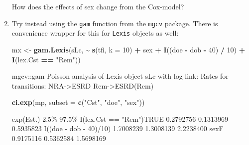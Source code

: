 \documentclass[
]{book}
\newenvironment{Shaded}{\begin{snugshade}}{\end{snugshade}}
\newcommand{\AttributeTok}[1]{\textcolor[rgb]{0.13,0.29,0.53}{#1}}
\newcommand{\DecValTok}[1]{\textcolor[rgb]{0.00,0.00,0.81}{#1}}
\newcommand{\FunctionTok}[1]{\textcolor[rgb]{0.13,0.29,0.53}{\textbf{#1}}}
\newcommand{\NormalTok}[1]{#1}
\newcommand{\OtherTok}[1]{\textcolor[rgb]{0.56,0.35,0.01}{#1}}
\newcommand{\SpecialCharTok}[1]{\textcolor[rgb]{0.81,0.36,0.00}{\textbf{#1}}}
\newcommand{\StringTok}[1]{\textcolor[rgb]{0.31,0.60,0.02}{#1}}
\begin{document}
\begin{enumerate}
  How does the effects of sex change from the Cox-model?
\item
  Try instead using the \texttt{gam} function from the
  \texttt{mgcv} package. There is convenience wrapper for this for
  \texttt{Lexis} objects as well:

\begin{Shaded}
\begin{Highlighting}[]
\NormalTok{mx }\OtherTok{\textless{}{-}} \FunctionTok{gam.Lexis}\NormalTok{(sLc,}
                \SpecialCharTok{\textasciitilde{}} \FunctionTok{s}\NormalTok{(tfi, }\AttributeTok{k =} \DecValTok{10}\NormalTok{) }\SpecialCharTok{+} 
\NormalTok{                  sex }\SpecialCharTok{+} \FunctionTok{I}\NormalTok{((doe }\SpecialCharTok{{-}}\NormalTok{ dob }\SpecialCharTok{{-}} \DecValTok{40}\NormalTok{) }\SpecialCharTok{/} \DecValTok{10}\NormalTok{) }\SpecialCharTok{+} 
                  \FunctionTok{I}\NormalTok{(lex.Cst }\SpecialCharTok{==} \StringTok{"Rem"}\NormalTok{))}
\end{Highlighting}
\end{Shaded}

\begin{Shaded}
\begin{Highlighting}[]
\NormalTok{mgcv::gam Poisson analysis of Lexis object sLc with log link:}
\NormalTok{Rates for transitions:}
\NormalTok{NRA{-}\textgreater{}ESRD}
\NormalTok{Rem{-}\textgreater{}ESRD(Rem)}
\end{Highlighting}
\end{Shaded}

\begin{Shaded}
\begin{Highlighting}[]
\FunctionTok{ci.exp}\NormalTok{(mp, }\AttributeTok{subset =} \FunctionTok{c}\NormalTok{(}\StringTok{"Cst"}\NormalTok{, }\StringTok{"doe"}\NormalTok{, }\StringTok{"sex"}\NormalTok{))}
\end{Highlighting}
\end{Shaded}

\begin{Shaded}
\begin{Highlighting}[]
\NormalTok{                        exp(Est.)      2.5\%     97.5\%}
\NormalTok{I(lex.Cst == "Rem")TRUE 0.2792756 0.1313969 0.5935823}
\NormalTok{I((doe {-} dob {-} 40)/10)  1.7008239 1.3008139 2.2238400}
\NormalTok{sexF                    0.9175116 0.5362584 1.5698169}
\end{Highlighting}
\end{Shaded}


\end{enumerate}
\end{document}
